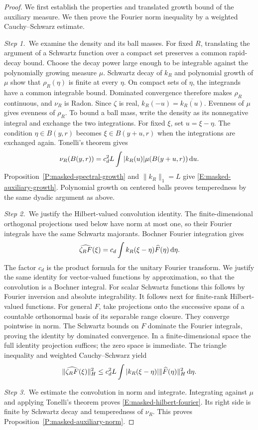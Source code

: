 \begin{proof}
  We first establish the properties and translated growth bound of the
  auxiliary measure. We then prove the Fourier norm inequality by a weighted
  Cauchy--Schwarz estimate.

  \medskip
  \noindent\textit{Step 1.~}We examine the density and its ball masses.
  For fixed $R$, translating the argument of a Schwartz function over a
  compact set preserves a common rapid-decay bound. Choose the decay power
  large enough to be integrable against the polynomially growing measure
  $\mu$.
  Schwartz decay of $k_R$ and polynomial growth of $\mu$ show that
  $\rho_R(\eta)$ is finite at every $\eta$. On compact sets of $\eta$, the
  integrands have a common integrable bound. Dominated convergence therefore
  makes $\rho_R$ continuous, and $\nu_R$ is Radon. Since $\zeta$ is real,
  $k_R(-u) = \overline{k_R(u)}$. Evenness of $\mu$ gives evenness of $\rho_R$.
  To bound a ball mass, write the density as its nonnegative integral and
  exchange the two integrations. For fixed $\xi$, set $u = \xi-\eta$. The
  condition $\eta \in B(y,r)$ becomes $\xi \in B(y+u,r)$ when the integrations
  are exchanged again.
  Tonelli's theorem gives
  \[
    \nu_R(B(y,r)) = c_d^2L\int |k_R(u)|\mu(B(y+u,r))\,\mathrm{d} u.
  \]
  Proposition~\ref{P:masked-spectral-growth} and $\|k_R\|_1 = L$ give
  \eqref{E:masked-auxiliary-growth}. Polynomial growth on centered balls proves
  temperedness by the same dyadic argument as above.

  \medskip
  \noindent\textit{Step 2.~}We justify the Hilbert-valued convolution
  identity.
  The finite-dimensional orthogonal projections used below have norm at most
  one, so their Fourier integrals have the same Schwartz majorants.
  Bochner Fourier integration gives
  \[
    \widehat{\zeta_RF}(\xi)
    = c_d\int k_R(\xi-\eta)\widehat{F}(\eta)\,\mathrm{d}\eta.
  \]
  The factor $c_d$ is the product formula for the unitary Fourier transform.
  We justify the same identity for vector-valued functions by approximation,
  so that the convolution is a Bochner integral.
  For scalar Schwartz functions this follows by Fourier inversion and absolute
  integrability. It follows next for finite-rank Hilbert-valued functions. For
  general $F$, take projections onto the successive spans of a countable
  orthonormal basis of its separable range closure. They converge pointwise in
  norm. The Schwartz bounds on $F$ dominate the Fourier integrals, proving the
  identity by dominated convergence. In a finite-dimensional space the full
  identity projection suffices; the zero space is immediate. The triangle
  inequality and weighted Cauchy--Schwarz yield
  \[
    \|\widehat{\zeta_RF}(\xi)\|_H^2
    \le c_d^2L\int |k_R(\xi-\eta)|\|\widehat{F}(\eta)\|_H^2\,\mathrm{d}\eta.
  \]

  \medskip
  \noindent\textit{Step 3.~}We estimate the convolution in norm and integrate.
  Integrating against $\mu$ and applying Tonelli's theorem proves
  \eqref{E:masked-hilbert-fourier}. Its right side is finite by Schwartz decay
  and temperedness of $\nu_R$. This proves
  Proposition~\ref{P:masked-auxiliary-norm}.
\end{proof}

